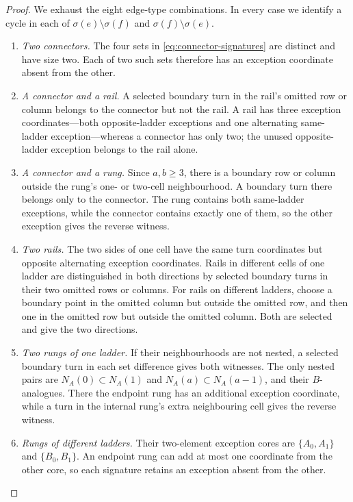 \begin{proof}
We exhaust the eight edge-type combinations.  In every case we identify a
cycle in each of \(\sigma(e)\setminus\sigma(f)\) and
\(\sigma(f)\setminus\sigma(e)\).

\begin{enumerate}[label=\arabic*.,leftmargin=*]
\item \emph{Two connectors.}  The four sets in
\cref{eq:connector-signatures} are distinct and have size two.  Each of two
such sets therefore has an exception coordinate absent from the other.

\item \emph{A connector and a rail.}  A selected boundary turn in the rail's
omitted row or column belongs to the connector but not the rail.  A rail has
three exception coordinates---both opposite-ladder exceptions and one
alternating same-ladder exception---whereas a connector has only two; the
unused opposite-ladder exception belongs to the rail alone.

\item \emph{A connector and a rung.}  Since \(a,b\ge3\), there is a boundary
row or column outside the rung's one- or two-cell neighbourhood.  A boundary
turn there belongs only to the connector.  The rung contains both
same-ladder exceptions, while the connector contains exactly one of them, so
the other exception gives the reverse witness.

\item \emph{Two rails.}  The two sides of one cell have the same turn
coordinates but opposite alternating exception coordinates.  Rails in
different cells of one ladder are distinguished in both directions by
selected boundary turns in their two omitted rows or columns.  For rails on
different ladders, choose a boundary point in the omitted column but outside
the omitted row, and then one in the omitted row but outside the omitted
column.  Both are selected and give the two directions.

\item \emph{Two rungs of one ladder.}  If their neighbourhoods are not
nested, a selected boundary turn in each set difference gives both witnesses.
The only nested pairs are
\(N_A(0)\subset N_A(1)\) and
\(N_A(a)\subset N_A(a-1)\), and their \(B\)-analogues.  There the endpoint
rung has an additional exception coordinate, while a turn in the internal
rung's extra neighbouring cell gives the reverse witness.

\item \emph{Rungs of different ladders.}  Their two-element exception cores
are \(\{A_0,A_1\}\) and \(\{B_0,B_1\}\).  An endpoint rung can add at most
one coordinate from the other core, so each signature retains an exception
absent from the other.


\end{enumerate}
\end{proof}
